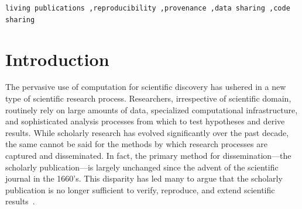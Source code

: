 \documentclass[review]{elsarticle}
\newcommand{\wt}{Whole\,Tale}
\begin{document}
\begin{frontmatter}
\begin{abstract}
The act of sharing scientific knowledge is rapidly evolving away from traditional articles and presentations to the delivery of executable objects that integrate the data and computational details (e.g., scripts and workflows) upon which the findings rely. This envisioned coupling of data 
and process is essential to advancing science but faces 
technical and institutional barriers. The \wt\ project aims to address these barriers by connecting computational, data-intensive research 
efforts with the larger research process---transforming the knowledge discovery 
and dissemination process into one where data products are united with research articles 
to create ``living publications'' or \emph{tales}. The \wt\ focuses on the full spectrum of science, empowering users in the long tail of science, and power users with demands for access to big data and compute resources. We report here on the design, architecture, and implementation of the \wt\ environment. 
\end{abstract}

\begin{keyword}
\texttt{living publications \sep reproducibility \sep provenance  \sep data sharing \sep code sharing}
\end{keyword}

\end{frontmatter}


\section{Introduction}\label{sec:intro}

The pervasive use of computation for scientific discovery has ushered in a new type of scientific research process. Researchers, irrespective of scientific domain, routinely rely on large amounts of data, specialized computational infrastructure, 
and sophisticated analysis processes from which to test hypotheses and derive
results. While scholarly research has evolved significantly over the past decade, 
the same cannot be said for the methods by which research processes are captured and disseminated. 
In fact, the primary method for dissemination---the scholarly publication---is largely unchanged since the advent of the scientific journal in the 1660’s. This disparity has led many to
argue that the scholarly publication is no longer sufficient to verify, reproduce, 
and extend scientific results~\cite{peng11reproducible, kratz14datapub, alsheikh11public,stodden_setting_2012,donoho_reproducible_2009,stodden_implementing_2014}.
\end{document}
